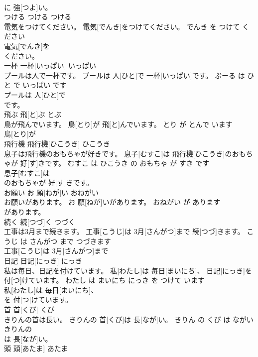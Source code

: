 \documentclass[8pt]{extreport}
\begin{document}
\begin{CJK}{UTF8}{min}
\\	に 強[つよ]い。			
\\	つける	つける	つける	
\\	電気をつけてください。	電気[でんき]をつけてください。	でんき を つけて ください	
\\	電気[でんき]を
\\	ください。			
\\	一杯	一杯[いっぱい]	いっぱい	
\\	プールは人で一杯です。	プールは 人[ひと]で 一杯[いっぱい]です。	ぷーる は ひと で いっぱい です	
\\	プールは 人[ひと]で
\\	です。			
\\	飛ぶ	飛[と]ぶ	とぶ	
\\	鳥が飛んでいます。	鳥[とり]が 飛[と]んでいます。	とり が とんで います	
\\	鳥[とり]が
\\	飛行機	飛行機[ひこうき]	ひこうき	
\\	息子は飛行機のおもちゃが好きです。	息子[むすこ]は 飛行機[ひこうき]のおもちゃが 好[す]きです。	むすこ は ひこうき の おもちゃ が すき です	
\\	息子[むすこ]は
\\	のおもちゃが 好[す]きです。			
\\	お願い	お 願[ねが]い	おねがい	
\\	お願いがあります。	お 願[ねが]いがあります。	おねがい が あります	
\\	があります。			
\\	続く	続[つづ]く	つづく	
\\	工事は3月まで続きます。	工事[こうじ]は 3月[さんがつ]まで 続[つづ]きます。	こうじ は さんがつ まで つづきます	
\\	工事[こうじ]は 3月[さんがつ]まで
\\	日記	日記[にっき]	にっき	
\\	私は毎日、日記を付けています。	私[わたし]は 毎日[まいにち]、 日記[にっき]を 付[つ]けています。	わたし は まいにち にっき を つけて います	
\\	私[わたし]は 毎日[まいにち]、
\\	を 付[つ]けています。			
\\	首	首[くび]	くび	
\\	きりんの首は長い。	きりんの 首[くび]は 長[なが]い。	きりん の くび は ながい	
\\	きりんの
\\	は 長[なが]い。			
\\	頭	頭[あたま]	あたま	

\end{CJK}
\end{document}
